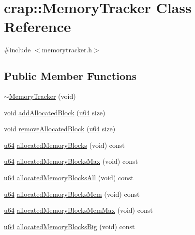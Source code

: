 \hypertarget{classcrap_1_1_memory_tracker}{\section{crap\-:\-:Memory\-Tracker Class Reference}
\label{classcrap_1_1_memory_tracker}
}


{\ttfamily \#include $<$memorytracker.\-h$>$}

\subsection*{Public Member Functions}
\begin{DoxyCompactItemize}
\item 
\hyperlink{classcrap_1_1_memory_tracker_ab0716dd893a69e436d13518839877928}{$\sim$\-Memory\-Tracker} (void)
\item 
void \hyperlink{classcrap_1_1_memory_tracker_a4359d60246c81633dcf7edb54cdb3ccd}{add\-Allocated\-Block} (\hyperlink{types_8h_a3f7e2bcbb0b4c338f3c4f6c937cd4234}{u64} size)
\item 
void \hyperlink{classcrap_1_1_memory_tracker_a31f0bd063637de46cbd50f687e3d8483}{remove\-Allocated\-Block} (\hyperlink{types_8h_a3f7e2bcbb0b4c338f3c4f6c937cd4234}{u64} size)
\item 
\hyperlink{types_8h_a3f7e2bcbb0b4c338f3c4f6c937cd4234}{u64} \hyperlink{classcrap_1_1_memory_tracker_af3493ef0fb8265b0995ef383c4b6e315}{allocated\-Memory\-Blocks} (void) const 
\item 
\hyperlink{types_8h_a3f7e2bcbb0b4c338f3c4f6c937cd4234}{u64} \hyperlink{classcrap_1_1_memory_tracker_a497bf283bd00573c40f19425e5294adb}{allocated\-Memory\-Blocks\-Max} (void) const 
\item 
\hyperlink{types_8h_a3f7e2bcbb0b4c338f3c4f6c937cd4234}{u64} \hyperlink{classcrap_1_1_memory_tracker_ab4a38fc8d81ae8c55c31d00d0572d31a}{allocated\-Memory\-Blocks\-All} (void) const 
\item 
\hyperlink{types_8h_a3f7e2bcbb0b4c338f3c4f6c937cd4234}{u64} \hyperlink{classcrap_1_1_memory_tracker_a65c6e6cf6a62252c0307c1d47c7ada84}{allocated\-Memory\-Blocks\-Mem} (void) const 
\item 
\hyperlink{types_8h_a3f7e2bcbb0b4c338f3c4f6c937cd4234}{u64} \hyperlink{classcrap_1_1_memory_tracker_ab8df5a98ac88d6043f21093610c213a1}{allocated\-Memory\-Blocks\-Mem\-Max} (void) const 
\item 
\hyperlink{types_8h_a3f7e2bcbb0b4c338f3c4f6c937cd4234}{u64} \hyperlink{classcrap_1_1_memory_tracker_a6277601119cc6039efbf811c32aa3a49}{allocated\-Memory\-Blocks\-Big} (void) const 

\end{DoxyCompactItemize}
